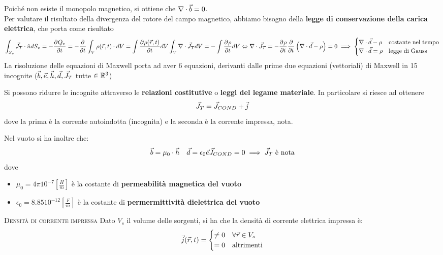 Poiché non esiste il monopolo magnetico, si ottiene che $\nabla\cdot\vec{b} =0$.\\
Per valutare il risultato della divergenza del rotore del campo magnetico, abbiamo bisogno della
\textbf{legge di conservazione della carica elettrica}, che porta come risultato
\begin{equation}
  \int_{S_v}\vec{J}_T \cdot \hat{n} d S_v = -\frac{\partial^{} {Q_v}}{\partial {t}^{}} = -\frac{\partial^{} {}}{\partial {t}^{}} \int_V \rho(\vec{r},t) \cdot dV = \int \frac{\partial^{} {\rho(\vec{r},t)}}{\partial {t}^{}} dV\\
  \int_V \nabla\cdot \vec{J}_T dV = - \int \frac{\partial^{} {\rho}}{\partial {t}^{}} dV \Leftrightarrow \nabla\cdot \vec{J}_T = -\frac{\partial^{} {\rho}}{\partial {t}^{}} \\
  \frac{\partial^{} {}}{\partial {t}^{}} \left(\nabla\cdot \vec{d} - \rho \right) =0 \implies
  \begin{cases}
    \nabla\cdot \vec{d} - \rho & \text{costante nel tempo} \\
    \nabla\cdot \vec{d} = \rho & \text{legge di Gauss}
  \end{cases}
\end{equation}
La risoluzione delle equazioni di Maxwell porta ad aver 6 equazioni, derivanti
dalle prime due equazioni (vettoriali) di Maxwell in 15 incognite ($\vec{b} , \vec{e} , \vec{h} , \vec{d} , \vec{J}_T $ tutte $\in \mathbb{R}^3$)

Si possono ridurre le incognite attraverso le \textbf{relazioni costitutive} o
\textbf{leggi del legame materiale}. In particolare si riesce ad ottenere
\begin{equation}
  \vec{J}_T = \vec{J}_{COND} + \vec{j}
\end{equation}
dove la prima è la corrente autoindotta (incognita) e la seconda è la corrente impressa, nota.

Nel vuoto si ha inoltre che:
\begin{equation}
  \vec{b} = \mu_0 \cdot \vec{h} \quad \vec{d} = \epsilon_0 \vec{e} \\
  \vec{J}_{COND} = 0 \implies \vec{J}_T \text{ è nota} \\
  \label{eq:bh-de-j}
\end{equation}
dove
\begin{itemize}
  \item $\mu_0 = 4 \pi 10^{-7} \left[\frac{H}{m}\right]$ è la costante di \textbf{permeabilità
  magnetica del vuoto}
  \item $\epsilon_0 = 8.85 10^{-12} \left[\frac{F}{m}\right]$ è la costante di \textbf{permermittività
  dielettrica del vuoto}
\end{itemize}

\textsc{Densità di corrente impressa}
Dato $V_s$ il volume delle sorgenti, si ha che la densità di corrente elettrica impressa è:
\begin{equation} \vec{j}(\vec{r},t)=
  \begin{cases}
    \neq 0 & \forall \vec{r} \in V_s \\
    =0 & \text{altrimenti}
  \end{cases}
  \label{eq:correnti}
\end{equation}

